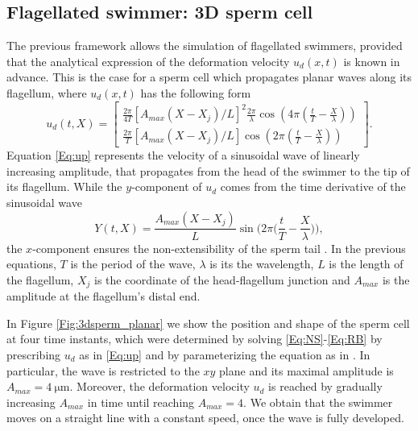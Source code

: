 \documentclass[graybox]{svmult}
\newcommand{\Vel}{u} %
\begin{document}
\subsection{Flagellated swimmer: 3D sperm cell}
The previous framework allows the simulation of flagellated swimmers, provided that the analytical expression of the deformation velocity $\Vel_d(x,t)$ is known in advance. This is the case for a sperm cell which propagates planar waves along its flagellum, where $\Vel_d(x,t)$ has the following form \cite{razavi_ale-based_2015}
\begin{equation}
	\Vel_d(t,X)=
	\begin{bmatrix}
		\frac{2\pi}{4T}[A_{max}(X-X_j)/L]^2\frac{2\pi}{\lambda}\cos(4\pi (\frac{t}{T}-\frac{X}{\lambda})) \\
		\frac{2\pi}{T}[A_{max}(X-X_j)/L]\cos(2\pi (\frac{t}{T}-\frac{X}{\lambda}))
	\end{bmatrix}.
	\label{Eq:up}
\end{equation}
Equation \eqref{Eq:up} represents the velocity of a sinusoidal wave of linearly increasing amplitude, that propagates from the head of the swimmer to the tip of its flagellum. 
While the $y$-component of $\Vel_d$ comes from the time derivative of the sinusoidal wave
\begin{equation*}
	Y(t,X) = \frac{A_{max}(X-X_j)}{L} \sin\Bigg(2\pi \Bigg(\frac{t}{T}-\frac{X}{\lambda}\Bigg)\Bigg),
\end{equation*}
the $x$-component ensures the non-extensibility of the sperm tail \cite{taylor_analysis_1951}. 
In the previous equations, $T$ is the period of the wave, $\lambda$ is its the wavelength, $L$ is the length of the flagellum, $X_j$ is the coordinate of the head-flagellum junction and $A_{max}$ is the amplitude at the flagellum's distal end.

In Figure \ref{Fig:3dsperm_planar} we show the position and shape of the sperm cell at four time instants, which were determined by solving \eqref{Eq:NS}-\eqref{Eq:RB} by prescribing $u_d$ as in \eqref{Eq:up} and by parameterizing the equation as in \cite{razavi_ale-based_2015}. In particular, the wave is restricted to the $xy$ plane and its maximal amplitude is $A_{max} = \SI{4}{\micro\meter}$. Moreover, the deformation velocity $\Vel_d$ is reached by gradually increasing $A_{max}$ in time until reaching $A_{max}=4$. We obtain that the swimmer moves on a straight line with a constant speed, once the wave is fully developed. 
\end{document}
